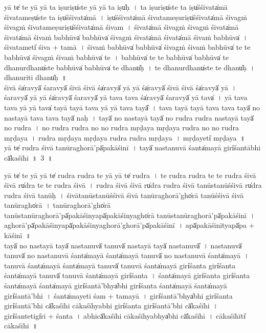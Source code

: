 \documentclass[parskip, DIV=14]{scrartcl}
\begin{document}
{yā te̍ te॒ yā yā ta॒ iṣu॒riṣu̍ste॒ yā yā ta॒ iṣu̍ḥ~। 
ta॒ iṣu॒riṣu̍ste ta॒ iṣu̍śśi॒vata̍mā śi॒vata॒meṣu̍ste ta॒ iṣu̍śśi॒vata̍mā~। 
iṣu̍śśi॒vata̍mā śi॒vata॒meṣu॒riṣu̍śśi॒vata̍mā śi॒vagṁ śi॒vagṁ śi॒vata॒meṣu॒riṣu̍śśi॒vata̍mā śi॒vam~। 
śi॒vata̍mā śi॒vagṁ śi॒vagṁ śi॒vata̍mā śi॒vata̍mā śi॒vaṁ ba॒bhūva̍ ba॒bhūva̍ śi॒vagṁ śi॒vata̍mā śi॒vata̍mā śi॒vaṁ ba॒bhūva̍~।
śi॒vata॒meti̍ śi॒va + ta॒mā॒~। 
śi॒vaṁ ba॒bhūva̍ ba॒bhūva̍ śi॒vagṁ śi॒vaṁ ba॒bhūva̍ te te ba॒bhūva̍ śi॒vagṁ śi॒vaṁ ba॒bhūva̍ te~। 
ba॒bhūva̍ te te ba॒bhūva̍ ba॒bhūva̍ te॒ dhanu॒rdhanu̍ste ba॒bhūva̍ ba॒bhūva̍ te॒ dhanu̍ḥ~। 
te॒ dhanu॒rdhanu̍ste te॒ dhanu̍ḥ~। 
dhanu॒riti॒  dhanu̍ḥ~॥ \\
 
\vspace{0.5cm}
śi॒vā śa̍ra॒vyā̍ śara॒vyā̍ śi॒vā śi॒vā śa̍ra॒vyā̍ yā yā śa̍ra॒vyā̍ śi॒vā śi॒vā śa̍ra॒vyā̍ yā~। 
śa॒ra॒vyā̍ yā yā śa̍ra॒vyā̍ śara॒vyā̍ yā tava॒ tava॒ śa̍ra॒vyā̍ śara॒vyā̍ yā tava̍~। 
yā tava॒ tava॒ yā yā tava̍ tayā॒ tayā॒ tava॒ yā yā tava॒ tayā̎~। 
tava॒ tayā॒ tayā॒ tava॒ tava॒ tayā̍ no na॒stayā॒ tava॒ tava॒ tayā̍ naḥ~। 
tayā̍ no na॒stayā॒ tayā̍ no rudra rudra na॒stayā॒ tayā̍ no rudra~। 
no॒ ru॒dra॒ ru॒dra॒  no॒ no॒ ru॒dra॒ mṛ॒ḍa॒ya॒ mṛ॒ḍa॒ya॒ ru॒dra॒ no॒ no॒ ru॒dra॒ mṛ॒ḍa॒ya॒~। 
ru॒dra॒  mṛ॒ḍa॒ya॒ mṛ॒ḍa॒ya॒ ru॒dra॒  ru॒dra॒ mṛ॒ḍa॒ya॒~। 
mṛ॒ḍa॒yeti̍  mṛḍaya~॥\\ 

\vspace{0.5cm}
yā te̍ rudra śi॒vā ta॒nūragho॒rā'pā̍pakāśinī~। 
tayā̍ nasta॒nuvā॒ śanta̍mayā॒ giri̍śantā॒bhi cā̍kaśīhi~॥~3~॥

yā te̍ te॒ yā yā te̍ rudra rudra te॒ yā yā te̍ rudra~। 
te॒ ru॒dra॒ ru॒dra॒ te॒ te॒ ru॒dra॒ śi॒vā śi॒vā ru̍dra te te rudra śi॒vā~। %
ru॒dra॒ śi॒vā śi॒vā ru̍dra rudra śi॒vā ta॒nūsta॒nūśśi॒vā ru̍dra rudra śi॒vā ta॒nūḥ~। 
śi॒vāta॒nūsta॒nūśśi॒vā śi॒vā ta॒nūragho॒rā'gho̍rā ta॒nūśśi॒vā śi॒vā ta॒nūragho̍rā~। 
ta॒nūragho॒rā'gho̍rā ta॒nūsta॒nūragho॒rā'pā̍pakāśi॒nyapā̍pakāśi॒nyagho̍rā ta॒nūsta॒nūragho॒rā'pā̍pakāśinī~। 
agho॒rā'pā̍pakāśi॒nyapā̍pakāśi॒nyagho॒rā'gho॒rā'pā̍pakāśinī~। 
apā̍pakāśi॒nītyapā̍pa + kā॒śi॒nī॒~॥\\ %

\vspace{0.5cm}
tayā̍ no na॒stayā॒ tayā̍ nasta॒nuvā̍ ta॒nuvā̍ na॒stayā॒ tayā̍ nasta॒nuvā̎~। 
na॒sta॒nuvā̍ ta॒nuvā̍ no nasta॒nuvā॒ śanta̍mayā॒ śanta̍mayā ta॒nuvā̍ no nasta॒nuvā॒ śanta̍mayā~। 
ta॒nuvā॒ śanta̍mayā॒ śanta̍mayā ta॒nuvā̍ ta॒nuvā॒ śanta̍mayā॒ giri̍śanta॒ giri̍śanta॒ śanta̍mayā ta॒nuvā̍ ta॒nuvā॒ śanta̍mayā॒ giri̍śanta~। %
śanta̍mayā॒ giri̍śanta॒ giri̍śanta॒ śanta̍mayā॒ śanta̍mayā॒ giri̍śantā॒'bhya̍bhi giri̍śanta॒ śanta̍mayā॒ śanta̍mayā॒ giri̍śantā॒'bhi~। 
śanta̍ma॒yeti॒ śam + ta॒ma॒yā॒~। 
giri̍śantā॒'bhya̍bhi giri̍śanta॒ giri̍śantā॒'bhi cā̍kaśīhi cākaśīhya॒bhi giri̍śanta॒ giri̍śantā॒'bhi cā̍kaśīhi~। %
giri̍śa॒nteti॒gi̍ri + śa॒nta॒~। %
a॒bhicā̍kaśīhi cākaśīhya॒bhya̍bhi cā̍kaśīhi~। 
cā॒ka॒śī॒hīti̍  cākaśīhi~॥\\ 

}
\end{document}
